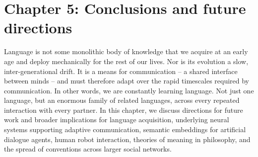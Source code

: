\documentclass[12pt, donotrepeattitle, man, floatsintext]{apa6}
\begin{document}
\vspace{1cm}
\noindent{}


\section{Chapter 5: Conclusions and future directions}

Language is not some monolithic body of knowledge that we acquire at an early age and deploy mechanically for the rest of our lives. Nor is its evolution a slow, inter-generational drift. It is a means for communication -- a shared interface between minds -- and must therefore adapt over the rapid timescales required by communication. In other words, we are constantly learning language. Not just one language, but an enormous family of related languages, across every repeated interaction with every partner. In this chapter, we discuss directions for future work and broader implications for language acquisition, underlying neural systems supporting adaptive communication, semantic embeddings for artificial dialogue agents, human robot interaction, theories of meaning in philosophy, and the spread of conventions across larger social networks.



\small
\singlespacing


\end{document}
